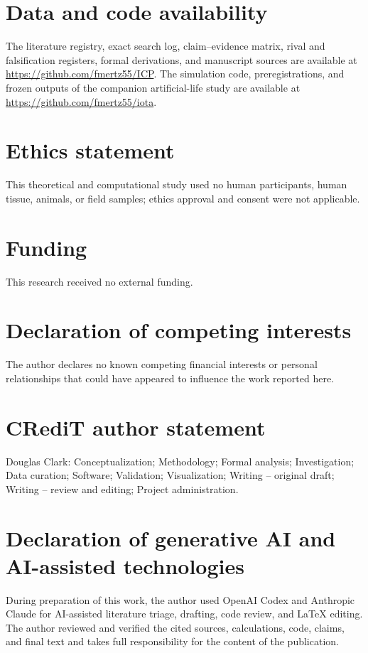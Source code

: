 \documentclass[11pt]{article}
\begin{document}
\linenumbers












\section*{Data and code availability}
The literature registry, exact search log, claim--evidence matrix, rival and
falsification registers, formal derivations, and manuscript sources are
available at \url{https://github.com/fmertz55/ICP}. The simulation code,
preregistrations, and frozen outputs of the companion artificial-life study are
available at \url{https://github.com/fmertz55/iota}.

\section*{Ethics statement}
This theoretical and computational study used no human participants, human
tissue, animals, or field samples; ethics approval and consent were not
applicable.

\section*{Funding}
This research received no external funding.

\section*{Declaration of competing interests}
The author declares no known competing financial interests or personal
relationships that could have appeared to influence the work reported here.

\section*{CRediT author statement}
Douglas Clark: Conceptualization; Methodology; Formal analysis; Investigation;
Data curation; Software; Validation; Visualization; Writing -- original draft;
Writing -- review and editing; Project administration.

\section*{Declaration of generative AI and AI-assisted technologies}
During preparation of this work, the author used OpenAI Codex and Anthropic Claude for
AI-assisted literature triage, drafting, code review, and LaTeX editing. The
author reviewed and verified the cited sources, calculations, code, claims, and
final text and takes full responsibility for the content of the publication.



\end{document}
